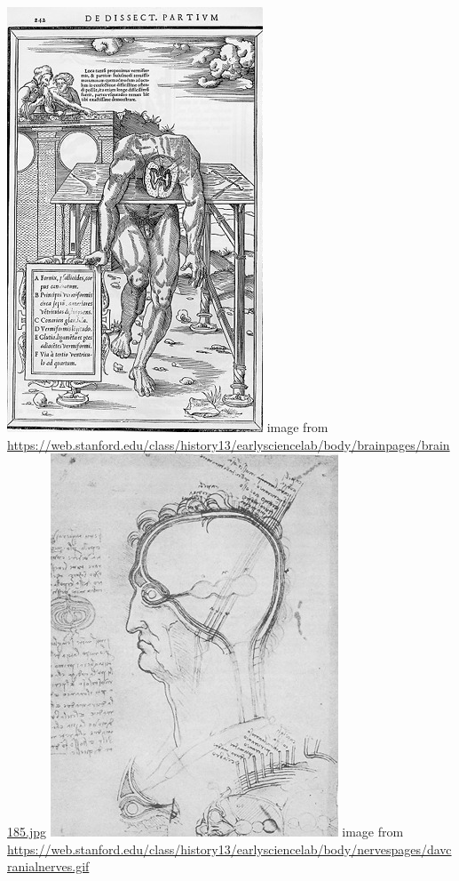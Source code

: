 \documentclass[12pt,a4paper]{article}
\begin{document}
\includegraphics[scale=1]{brain185.jpg}\newline
image from \url{https://web.stanford.edu/class/history13/earlysciencelab/body/brainpages/brain185.jpg}
\newline
\includegraphics[scale=1]{davcranialnerves.jpg}\newline
image from \url{https://web.stanford.edu/class/history13/earlysciencelab/body/nervespages/davcranialnerves.gif}\newline
\end{document}
